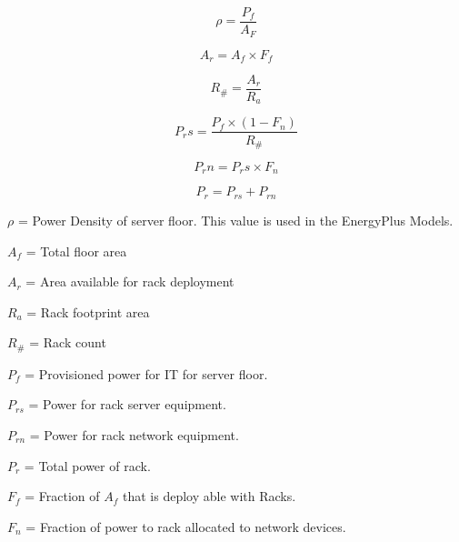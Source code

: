     \begin{equation} 
    \label{eq:floor_per_density}
        \rho= \frac{P_{f}}{A_{F}}
    \end{equation}
    
    \begin{equation} 
    \label{eq:area_for_racks}
        A_{r}= A_{f} \times F_{f}
    \end{equation}
    
    \begin{equation} 
    \label{eq:rack_count}
        R_{\#}= \frac{A_{r}}{R_{a}}
    \end{equation}
    
    \begin{equation} 
    \label{eq:rack_power_server}
        P_rs = \frac{P_f \times (1-F_{n})}{R_{\#}}
    \end{equation} 
    
    \begin{equation} 
    \label{eq:rack_power_network}   
        P_rn = P_rs \times F_{n}
    \end{equation} 
     
    \begin{equation} 
    \label{eq:rack_power} 
        P_r = P_{rs} + P_{rn}
    \end{equation} 
    
    \begin{small}
    \begin{center}
    
    $\rho$ = Power Density of server floor. This value is used in the EnergyPlus Models.
    
    $A_{f}$ = Total floor area
    
    $A_{r}$ = Area available for rack deployment
    
    $R_{a}$ = Rack footprint area
    
    $R_{\#}$ = Rack count
    
    $P_{f}$ = Provisioned power for IT for server floor.
    
    $P_{rs}$ = Power for rack server equipment.
    
    $P_{rn}$ = Power for rack network equipment.
    
    $P_{r}$ = Total power of rack.
    
    $F_{f}$ = Fraction of $A_{f}$ that is deploy able with Racks.
    
    $F_{n}$ = Fraction of power to rack allocated to network devices. 
    
    \end{center}
    \end{small}